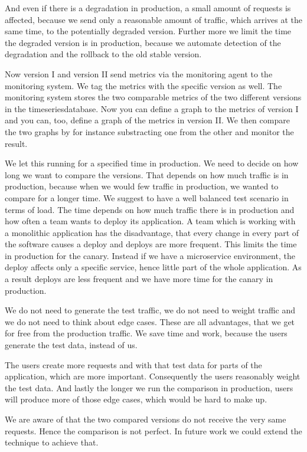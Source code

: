 And even if there is a degradation in production, a small amount of requests is affected,
because we send only a reasonable amount of traffic, which arrives at the same time, to
the potentially degraded version. Further more we limit the time the degraded version is
in production, because we automate detection of the degradation and the rollback to the
old stable version.

Now version I and version II send metrics via the monitoring agent to the monitoring
system. We tag the metrics with the specific version as well. The monitoring system stores
the two comparable metrics of the two different versions in the timeseriesdatabase. Now
you can define a graph to the metrics of version I and you can, too, define a graph of the
metrics in version II. We then compare the two graphs by for instance substracting one
from the other and monitor the result.

We let this running for a specified time in production. We need to decide on how long we
want to compare the versions. That depends on how much traffic is in production, because
when we would few traffic in production, we wanted to compare for a longer time. We
suggest to have a well balanced test scenario in terms of load. The time depends on how
much traffic there is in production and how often a team wants to deploy its
application. A team which is working with a monolithic application has the disadvantage,
that every change in every part of the software causes a deploy and deploys are more
frequent. This limits the time in production for the canary. Instead if we have a
microservice environment, the deploy affects only a specific service, hence little part of
the whole application. As a result deploys are less frequent and we have more time for the
canary in production.

We do not need to generate the test traffic, we do not need to weight traffic and we do
not need to think about edge cases. These are all advantages, that we get for free from
the production traffic. We save time and work, because the users generate the test data,
instead of us.

The users create more requests and with that test data for parts of the application, which
are more important. Consequently the users reasonably weight the test data. And lastly the
longer we run the comparison in production, users will produce more of those edge cases,
which would be hard to make up.

We are aware of that the two compared versions do not receive the very same
requests. Hence the comparison is not perfect. In future work we could extend the
technique to achieve that.

